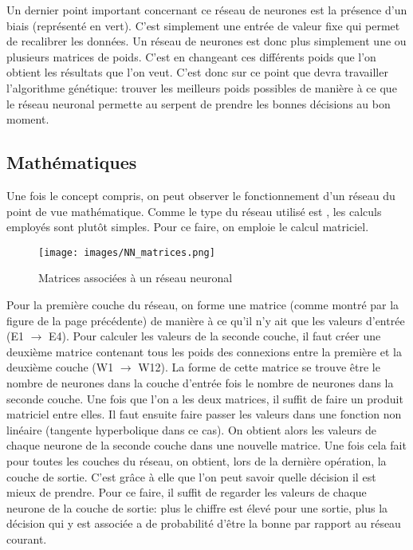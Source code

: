 \documentclass[12pt, a4paper, openany]{book}
\begin{document}
Un dernier point important concernant ce réseau de neurones est la présence d'un biais (représenté en vert). C'est simplement une entrée de valeur fixe qui permet de recalibrer les données.\newline
Un réseau de neurones est donc plus simplement une ou plusieurs matrices de poids. C'est en changeant ces différents poids que l'on obtient les résultats que l'on veut. C'est donc sur ce point que devra travailler l’algorithme génétique: trouver les meilleurs poids possibles de manière à ce que le réseau neuronal permette au serpent de prendre les bonnes décisions au bon moment.

\subsection{Mathématiques}
\label{r:2.3.2}
Une fois le concept compris, on peut observer le fonctionnement d'un réseau du point de vue mathématique. Comme le type du réseau utilisé est \fg, les calculs employés sont plutôt simples. Pour ce faire, on emploie le calcul matriciel.
\begin{figure}[H]
    \centering
    \texttt{[image: images/NN\_matrices.png]}
    \caption{Matrices associées à un réseau neuronal}
\end{figure}\newpage
Pour la première couche du réseau, on forme une matrice (comme montré par la figure de la page précédente) de manière à ce qu'il n'y ait que les valeurs d'entrée (E1 $\to$ E4). Pour calculer les valeurs de la seconde couche, il faut créer une deuxième matrice contenant tous les poids des connexions entre la première et la deuxième couche (W1 $\to$ W12). La forme de cette matrice se trouve être le nombre de neurones dans la couche d'entrée fois le nombre de neurones dans la seconde couche. Une fois que l'on a les deux matrices, il suffit de faire un produit matriciel entre elles. Il faut ensuite faire passer les valeurs dans une fonction non linéaire (tangente hyperbolique dans ce cas). On obtient alors les valeurs de chaque neurone de la seconde couche dans une nouvelle matrice.\newline
Une fois cela fait pour toutes les couches du réseau, on obtient, lors de la dernière opération, la couche de sortie. C'est grâce à elle que l'on peut savoir quelle décision il est mieux de prendre. Pour ce faire, il suffit de regarder les valeurs de chaque neurone de la couche de sortie: plus le chiffre est élevé pour une sortie, plus la décision qui y est associée a de probabilité d'être la bonne par rapport au réseau courant.
\end{document}
